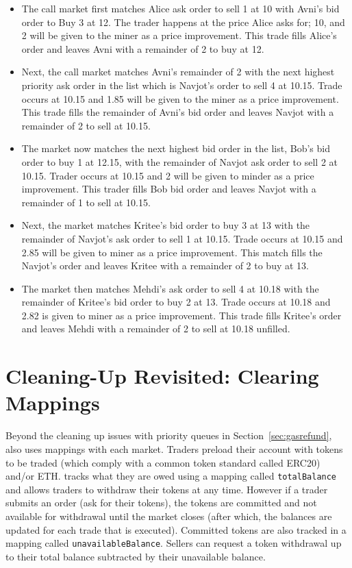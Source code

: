 \label{app:cm}
\begin{itemize}
\item The call market first matches Alice ask order to sell 1 at 10 with Avni's bid order to Buy 3 at 12. The trader happens at the price Alice asks for; 10, and 2 will be given to the miner as a price improvement. This trade fills Alice's order and leaves Avni with a remainder of 2 to buy at 12. 
\item Next, the call market matches Avni's remainder of 2 with the next highest priority ask order in the list which is Navjot's order to sell 4 at 10.15. Trade occurs at 10.15 and 1.85 will be given to the miner as a price improvement. This trade fills the remainder of Avni's bid order and leaves Navjot with a remainder of 2 to sell at 10.15.
\item The market now matches the next highest bid order in the list, Bob's bid order to buy 1 at 12.15, with the remainder of Navjot ask order to sell 2 at 10.15. Trader occurs at 10.15 and 2 will be given to minder as a price improvement. This trader fills Bob bid order and leaves Navjot with a remainder of 1 to sell at 10.15.
\item Next, the market matches Kritee's bid order to buy 3 at 13 with the remainder of Navjot's ask order to sell 1 at 10.15. Trade occurs at 10.15 and 2.85 will be given to miner as a price improvement. This match fills the Navjot's order and leaves Kritee with a remainder of 2 to buy at 13.
\item The market then matches Mehdi's ask order to sell 4 at 10.18 with the remainder of Kritee's bid order to buy 2 at 13. Trade occurs at 10.18 and 2.82 is given to miner as a price improvement. This trade fills Kritee's order and leaves Mehdi with a remainder of 2 to sell at 10.18 unfilled. 
\end{itemize}

\section{Cleaning-Up Revisited: Clearing Mappings}
\label{app:clean}

Beyond the cleaning up issues with priority queues in Section~\ref{sec:gasrefund}, \cm also uses mappings with each market. Traders preload their account with tokens to be traded (which comply with a common token standard called ERC20) and/or ETH. \cm tracks what they are owed using a mapping called \texttt{totalBalance} and allows traders to withdraw their tokens at any time. However if a trader submits an order (\ie ask for their tokens), the tokens are committed and not available for withdrawal until the market closes (after which, the balances are updated for each trade that is executed). Committed tokens are also tracked in a mapping called \texttt{unavailableBalance}. Sellers can request a token withdrawal up to their total balance subtracted by their unavailable balance.

